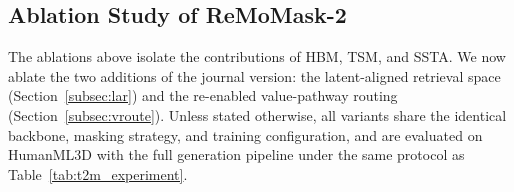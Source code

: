 \documentclass[10pt,journal,compsoc]{IEEEtran}
\begin{document}
\begin{table}[t]
    \centering
    \renewcommand{\arraystretch}{1.0}  %
    \caption{Complete retrieval ablation analysis on HumanML3D.}
    \label{tab:rag_ablation}
\end{table}


\subsection{Ablation Study of ReMoMask-2}
\label{subsec:ablation_v2}
The ablations above isolate the contributions of HBM, TSM, and SSTA. We now ablate the two additions of the journal version: the latent-aligned retrieval space (Section~\ref{subsec:lar}) and the re-enabled value-pathway routing (Section~\ref{subsec:vroute}).
Unless stated otherwise, all variants share the identical backbone, masking strategy, and training configuration, and are evaluated on HumanML3D with the full generation pipeline under the same protocol as Table~\ref{tab:t2m_experiment}.
\end{document}
